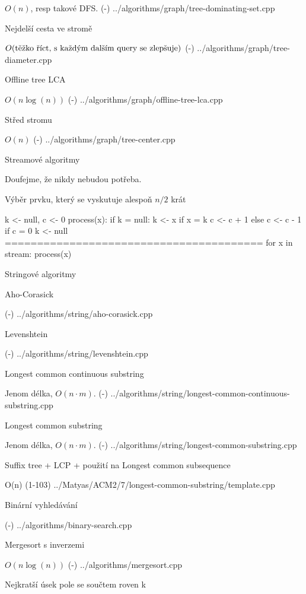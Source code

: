 $O(n)$, resp takové DFS.
\verbinput (-) ../algorithms/graph/tree-dominating-set.cpp

\secc Nejdelší cesta ve stromě 

$O(\hbox{těžko říct, s každým dalším query se zlepšuje})$
\verbinput (-) ../algorithms/graph/tree-diameter.cpp

\secc Offline tree LCA 

$O(n\log(n))$
\verbinput (-) ../algorithms/graph/offline-tree-lca.cpp

\secc Střed stromu 

$O(n)$
\verbinput (-) ../algorithms/graph/tree-center.cpp

\sec Streamové algoritmy

Doufejme, že nikdy nebudou potřeba.

\secc Výběr prvku, který se vyskutuje alespoň $n/2$ krát

\begtt
k <- null, c <- 0
process(x):
  if k = null:
    k <- x
  if x = k
    c <- c + 1
  else
    c <- c - 1
    if c = 0
      k <- null
========================================
for x in stream:
  process(x)
\endtt

\sec Stringové algoritmy

\secc Aho-Corasick

\verbinput (-) ../algorithms/string/aho-corasick.cpp

\secc Levenshtein 

\verbinput (-) ../algorithms/string/levenshtein.cpp

\secc Longest common continuous substring 

Jenom délka, $O(n \cdot m)$.
\verbinput (-) ../algorithms/string/longest-common-continuous-substring.cpp

\secc Longest common substring 

Jenom délka, $O(n \cdot m)$.
\verbinput (-) ../algorithms/string/longest-common-substring.cpp

\secc Suffix tree + LCP + použití na Longest common subsequence 

O(n)
\verbinput (1-103) ../Matyas/ACM2/7/longest-common-substring/template.cpp

\sec Binární vyhledávání 

\verbinput (-) ../algorithms/binary-search.cpp

\sec Mergesort s inverzemi 

$O(n\log(n))$
\verbinput (-) ../algorithms/mergesort.cpp

\sec Nejkratší úsek pole se součtem roven k 

